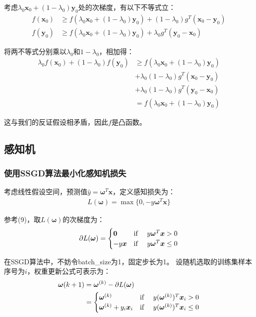 \documentclass[12pt, a4paper]{article}
\newcommand{\ivec}{\bm}
\newcommand{\omegav}{\ivec{\omega}}
\newcommand{\xv}{\ivec{x}}
\newcommand{\yv}{\ivec{y}}
\begin{document}
        考虑$\lambda_0 \xv_0 + (1 - \lambda_0) \yv_0$处的次梯度，有以下不等式立：
        \begin{align*}
        f(\xv_0) &\ge f(\lambda_0 \xv_0 + (1 - \lambda_0) \yv_0) + (1 - \lambda_0) g^T (\xv_0 - \yv_0) \\
        f(\yv_0) &\ge f(\lambda_0 \xv_0 + (1 - \lambda_0) \yv_0) + \lambda_0 g^T (\yv_0 - \xv_0)
        \end{align*}

        将两不等式分别乘以$\lambda_0$和$1 - \lambda_0$，相加得：
        \begin{align*}
        \lambda_0 f(\xv_0) + (1 - \lambda_0) f(\yv_0) &\ge f(\lambda_0 \xv_0 + (1 - \lambda_0) \yv_0) \\
        &+ \lambda_0 (1 - \lambda_0) g^T (\xv_0 - \yv_0) \\
        &+ \lambda_0 (1 - \lambda_0) g^T (\yv_0 - \xv_0) \\
        &= f(\lambda_0 \xv_0 + (1 - \lambda_0) \yv_0)
        \end{align*}

        这与我们的反证假设相矛盾，因此$f$是凸函数。

    \subsection{感知机}

    \subsubsection{使用SSGD算法最小化感知机损失}

        考虑线性假设空间，预测值$\hat{y} = \omegav^T \xv$，定义感知损失为：
        \begin{align*}
        L(\omegav) = \max\{0, -y \omegav^T \xv\}
        \end{align*}

        参考(9)，取$L(\omegav)$的次梯度为：
        \begin{align*}
        \partial L(\omegav) =
        \begin{cases}
        \ivec{0}      & \text{if \quad} y \omegav^T \xv > 0 \\
        -y \xv        & \text{if \quad} y \omegav^T \xv \le 0
        \end{cases}
        \end{align*}

        在SSGD算法中，不妨令batch\_size为1，固定步长为1。
        设随机选取的训练集样本序号为$i$，权重更新公式可表示为：
        \begin{align*}
        \omegav{(k + 1)}
        &= \omegav^{(k)} - \partial L(\omegav) \\
        &=
        \begin{cases}
        \omegav^{(k)}             & \text{if \quad} y (\omegav^{(k)})^T \xv_i > 0 \\
        \omegav^{(k)} + y_i \xv_i & \text{if \quad} y (\omegav^{(k)})^T \xv_i \le 0
        \end{cases}
        \end{align*}
\end{document}
